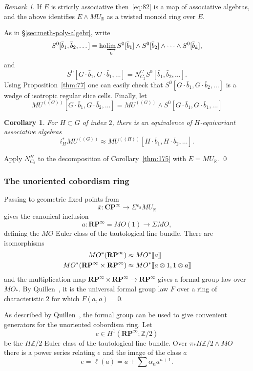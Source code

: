 \documentclass{amsart}
\newtheorem{cor}[equation]{Corollary}
\newtheorem{rem}[equation]{Remark}
\theoremstyle{definition}
\theoremstyle{remark}
\newtheorem{rem}[equation]{Remark}
\newenvironment{pf}{\bigskip{\em Proof:\/}}{\qed\medskip}
\newcommand{\Z}{{\mathbb Z}}
\newcommand{\R}{{\mathbb R}}
\newcommand{\LL}{[\mkern-2mu[}
\newcommand{\RR}{]\mkern-2mu]}
\newcommand{\cp}{\mathbf{CP}}
\newcommand{\rp}{\mathbf{RP}}
\newcommand{\mur}{MU_{\R}}
\newcommand{\mutn}[1]{MU^{(\!(#1)\!)}}
\DeclareMathOperator{\ho}{ho}
\newcommand{\norm}{N}
\newcommand{\gbar}{\bar}
\newcommand{\hocolim}{\ho\!\varinjlim}
\newcommand{\zt}{C_{2}}
\begin{document}
\begin{rem}
\label{rem:27} If $E$ is strictly associative then~\eqref{eq:82} is
a map of associative algebras, and the above identifies $E\wedge \mur$
as a twisted monoid ring over $E$.
\end{rem}

As in \S\ref{sec:meth-poly-algebr}, write 
\[
S^{0}[\gbar{b}_{1},\gbar{b}_{2},\dots] = \hocolim_{k}S^{0}[\gbar{b}_{1}]\wedge
S^{0}[\gbar{b}_{2}]\wedge\cdots\wedge S^{0}[\gbar{b}_{k}],
\]
and
\[
S^{0}[G\cdot\gbar{b}_{1},G\cdot\gbar{b}_{1},\dots ] = \norm_{\zt}^{G}
S^{0}[\gbar{b}_{1},\gbar{b}_{2},\dots].
\]
Using Proposition~\ref{thm:77} one can easily check that
$S^{0}[G\cdot\gbar{b}_{1},G\cdot\gbar{b}_{2},\dots]$ is a wedge of
isotropic regular slice cells.  Finally, let
\[
\mutn{G}[G\cdot \gbar{b}_{1},G\cdot\gbar{b}_{2},\dots] =
\mutn{G}\wedge S^{0}[G\cdot\gbar{b}_{1},G\cdot\gbar{b}_{1},\dots] 
\]

\begin{cor}
\label{thm:176} For $H\subset G$ of index $2$, there is an equivalence
of $H$-equivariant associative algebras
\[
i_{H}^{\ast}\mutn{G} \approx \mutn{H}[H\cdot
\gbar{b}_{1},H\cdot\gbar{b}_{2},\dots].
\]
\end{cor}

\begin{pf}
Apply $\norm_{\zt}^{H}$ to the decomposition of Corollary~\ref{thm:175}
with $E=\mur$.
\end{pf}

\subsubsection{The unoriented cobordism ring}
\label{sec:unor-cobord-ring}
Passing to geometric fixed points from
\[
\bar x:\cp^{\infty}\to \Sigma^{\rho_{2}}\mur
\]
gives the canonical inclusion
\[
a:\rp^{\infty} = MO(1)\to \Sigma MO,
\]
defining the $MO$ Euler class of the tautological line bundle.  There
are isomorphisms
\begin{align*}
MO^{\ast}(\rp^{\infty})&\approx MO^{\ast}\LL a\RR \\
MO^{\ast}(\rp^{\infty}\times\rp^{\infty})&\approx MO^{\ast}\LL a\otimes
1, 1\otimes a\RR
\end{align*}
and the multiplication map
$\rp^{\infty}\times\rp^{\infty}\to\rp^{\infty}$ gives a formal group
law over $MO_{\ast}$.  By Quillen~\cite{Qui:FGL}, it is the universal
formal group law $F$ over a ring of characteristic $2$ for which
$F(a,a)=0$.

As described by Quillen~\cite[Page~53]{MR0290382}, the formal group can
be used to give convenient generators for the unoriented cobordism
ring.  Let 
\[
e\in H^{1}(\rp^{\infty};\Z/2)
\]
be the $H\Z/2$ Euler class of the tautological line bundle.  Over
$\pi_{\ast}H\Z/2\wedge MO$ there is a power series relating $e$ and
the image of the class $a$
\[
e = \ell(a) = a+ \sum \alpha_{n} a^{n+1}.
\]
\end{document}
